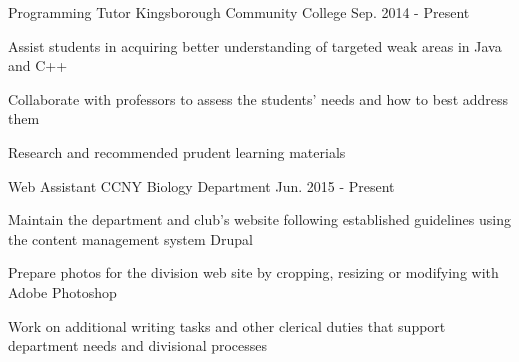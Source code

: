 \begin{cventries}

\iftrue
  \cventry
    {Programming Tutor} %
    {Kingsborough Community College} %
	{Sep. 2014 - Present} %
    {} %
    {
      \begin{cvitems} %
        \item {Assist students in acquiring better understanding of targeted weak areas in Java and C++}
        \item {Collaborate with professors to assess the students’ needs and how to best address them}
        \item {Research and recommended prudent learning materials}
      \end{cvitems}
    }
\fi

\iftrue
  \cventry
    {Web Assistant} %
    {CCNY Biology Department} %
	{Jun. 2015 - Present} %
    {} %
    {
      \begin{cvitems} %
        \item {Maintain the department and club's website following
			established guidelines using the content management system Drupal}
        \item {Prepare photos for the division web site by cropping,
		  resizing or modifying with Adobe Photoshop}
        \item {Work on additional writing tasks and other clerical duties that
		  support department needs and divisional processes}
      \end{cvitems}
    }
\fi


\end{cventries}
